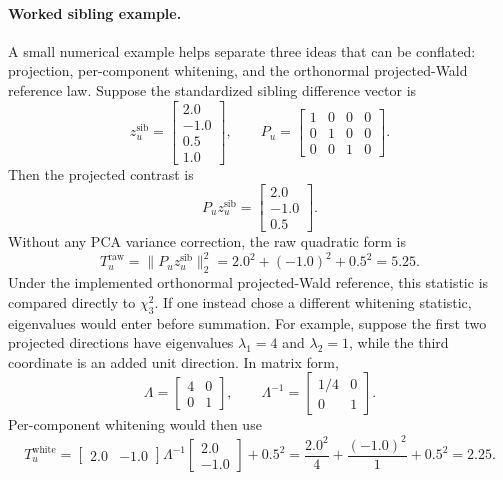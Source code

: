 \paragraph{Worked sibling example.}
A small numerical example helps separate three ideas that can be conflated:
projection, per-component whitening, and the orthonormal projected-Wald
reference law. Suppose the standardized sibling difference vector is
\begin{equation}
z_u^{\mathrm{sib}} =
\begin{bmatrix}
2.0\\
-1.0\\
0.5\\
1.0
\end{bmatrix},
\qquad
P_u =
\begin{bmatrix}
1&0&0&0\\
0&1&0&0\\
0&0&1&0
\end{bmatrix}.
\end{equation}
Then the projected contrast is
\begin{equation}
P_u z_u^{\mathrm{sib}} =
\begin{bmatrix}
2.0\\
-1.0\\
0.5
\end{bmatrix}.
\end{equation}
Without any PCA variance correction, the raw quadratic form is
\begin{equation}
T_u^{\mathrm{raw}}
=
\|P_u z_u^{\mathrm{sib}}\|_2^2
=
2.0^2 + (-1.0)^2 + 0.5^2
=
5.25.
\end{equation}
Under the implemented orthonormal projected-Wald reference, this statistic is
compared directly to $\chi^2_3$. If one instead chose a different whitening
statistic, eigenvalues would enter before summation. For example, suppose the
first two projected directions have eigenvalues $\lambda_1 = 4$ and
$\lambda_2 = 1$, while the third coordinate is an added unit direction. In
matrix form,
\begin{equation}
\Lambda =
\begin{bmatrix}
4&0\\
0&1
\end{bmatrix},
\qquad
\Lambda^{-1} =
\begin{bmatrix}
1/4&0\\
0&1
\end{bmatrix}.
\end{equation}
Per-component whitening would then use
\begin{equation}
T_u^{\mathrm{white}}
=
\begin{bmatrix}
2.0 & -1.0
\end{bmatrix}
\Lambda^{-1}
\begin{bmatrix}
2.0\\
-1.0
\end{bmatrix}
+
0.5^2
=
\frac{2.0^2}{4}
+
\frac{(-1.0)^2}{1}
+
0.5^2
=
2.25.
\end{equation}
